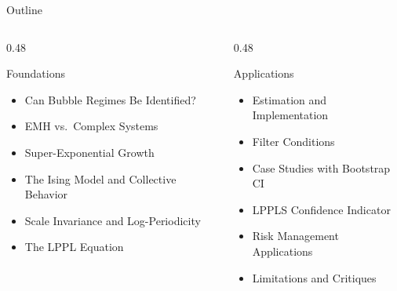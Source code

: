 \documentclass[9pt, aspectratio=169, t]{beamer}
\begin{document}
\begin{frame}{Outline}
    \vspace{-0.3cm}
    {\small
    \begin{columns}[T]
        \begin{column}{0.48\textwidth}
            \begin{block}{Foundations}
                \begin{itemize}\setlength{\itemsep}{3pt}
                    \item Can Bubble Regimes Be Identified?
                    \item EMH vs.\ Complex Systems
                    \item Super-Exponential Growth
                    \item The Ising Model and Collective Behavior
                    \item Scale Invariance and Log-Periodicity
                    \item The LPPL Equation
                \end{itemize}
            \end{block}
        \end{column}
        \begin{column}{0.48\textwidth}
            \begin{exampleblock}{Applications}
                \begin{itemize}\setlength{\itemsep}{3pt}
                    \item Estimation and Implementation
                    \item Filter Conditions
                    \item Case Studies with Bootstrap CI
                    \item LPPLS Confidence Indicator
                    \item Risk Management Applications
                    \item Limitations and Critiques
                \end{itemize}
            \end{exampleblock}
        \end{column}
    \end{columns}
    }
\end{frame}

\end{document}
